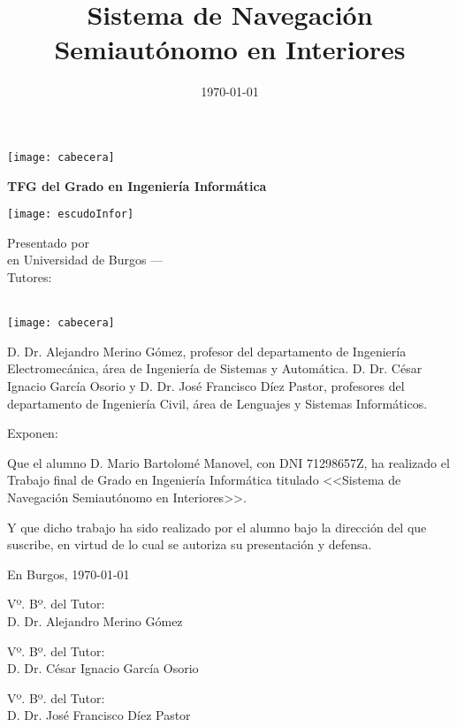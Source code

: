 \documentclass[a4paper,11pt,oneside]{memoir}
\title{Sistema de Navegación Semiautónomo en Interiores}
\author{\nombre}
\date{\today}
\makeatletter
\newcommand{\tutor}[1]{\def\@tutor{#1}}
\newcommand{\cotutorOne}[1]{\def\@cotutorOne{#1}}
\newcommand{\cotutorTwo}[1]{\def\@cotutorTwo{#1}}
\def\maketitle{
  \null
  \thispagestyle{empty}
\noindent\texttt{[image: cabecera]}\vspace{1cm}%
  \vfill
  \colorbox{cpardoBox}{%
    \begin{minipage}{.9\textwidth}
      \vspace{.5cm}\large
      \begin{center}
      \textbf{TFG del Grado en Ingeniería Informática}\vspace{.6cm}\\
      \textbf{\@title{}}
      \end{center}
      \vspace{.2cm}
    \end{minipage}

  }%
  \hfill\begin{minipage}{.20\textwidth}
    \texttt{[image: escudoInfor]}
  \end{minipage}
  \vfill
  \begin{center}%
  {%
    \noindent\large
    Presentado por \@author{}\\ 
    en Universidad de Burgos --- \@date{}\vspace{.6cm}\\
    \noindent Tutores: \@tutor{}\\\@cotutorOne{}\\\@cotutorTwo{}
  }%
  \end{center}%
  \null
  \cleardoublepage
  }
\newcommand{\nombre}{Mario Bartolomé Manovel} %
\makeatother
\begin{document}
\maketitle
\def\titulo{Sistema de Navegación Semiautónomo en Interiores}
\def\tutor{Dr. Alejandro Merino Gómez}
\def\cotutorOne{Dr. César Ignacio García Osorio}
\def\cotutorTwo{Dr. José Francisco Díez Pastor}
\newpage\null\thispagestyle{empty}\newpage


\thispagestyle{empty}


\noindent\texttt{[image: cabecera]}\vspace{1cm}

\noindent D. \tutor, profesor del departamento de Ingeniería Electromecánica, área de Ingeniería de Sistemas y Automática. D. \cotutorOne{} y D. \cotutorTwo{}, profesores del departamento de Ingeniería Civil, área de Lenguajes y Sistemas Informáticos.

\noindent Exponen:

\noindent Que el alumno D. \nombre, con DNI 71298657Z, ha realizado el Trabajo final de Grado en Ingeniería Informática titulado <<\titulo>>. 

\noindent Y que dicho trabajo ha sido realizado por el alumno bajo la dirección del que suscribe, en virtud de lo cual se autoriza su presentación y defensa. 

\begin{center} %
En Burgos, {\large \today}
\end{center}

\vfill\vfill\vfill


\begin{minipage}{0.3\textwidth}
\raggedright
Vº. Bº. del Tutor:\\[2cm]
D. \tutor
\end{minipage}
\hfill
\begin{minipage}{0.3\textwidth}
\centering
Vº. Bº. del Tutor:\\[2cm]
D. \cotutorOne
\end{minipage}
\hfill
\begin{minipage}{0.3\textwidth}
\raggedleft
Vº. Bº. del Tutor:\\[2cm]
D. \cotutorTwo
\end{minipage}
\hfill
\vfill

%
\end{document}
